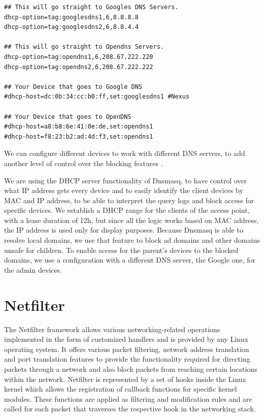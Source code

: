 \begin{lstlisting}
## This will go straight to Googles DNS Servers.
dhcp-option=tag:googlesdns1,6,8.8.8.8
dhcp-option=tag:googlesdns2,6,8.8.4.4

## This will go straight to Opendns Servers.
dhcp-option=tag:opendns1,6,208.67.222.220
dhcp-option=tag:opendns2,6,208.67.222.222

## Your Device that goes to Google DNS
#dhcp-host=dc:0b:34:cc:b0:ff,set:googlesdns1 #Nexus

## Your Device that goes to OpenDNS
#dhcp-host=a8:b8:6e:41:0e:de,set:opendns1
#dhcp-host=f8:23:b2:ad:4d:f3,set:opendns1
\end{lstlisting}

We can configure different devices to work with different DNS servers, to add another level of control over the blocking features \cite{archwikiDnsmasq}.

We are using the DHCP server functionality of Dnsmasq, to have control over what IP address gets every device and to easily identify the client devices by MAC and IP address, to be able to interpret the query logs and block access for specific devices. We establish a DHCP range for the clients of the access point, with a lease duration of 12h, but since all the logic works based on MAC address, the IP address is used only for display purposes. Because Dnsmasq is able to resolve local domains, we use that feature to block ad domains and other domains unsafe for children. To enable access for the parent's devices to the blocked domains, we use a configuration with a different DNS server, the Google one, for the admin devices.

\section{Netfilter}

The Netfilter framework \citep{netfilterorg} allows various networking-related operations implemented in the form of customized handlers and is provided by any Linux operating system. It offers various packet filtering, network address translation and port translation features to provide the functionality required for directing packets through a network and also block packets from reaching certain locations within the network. Netfilter is represented by a set of hooks inside the Linux kernel which allows the registration of callback functions for specific kernel modules. These functions are applied as filtering and modification rules and are called for each packet that traverses the respective hook in the networking stack.

